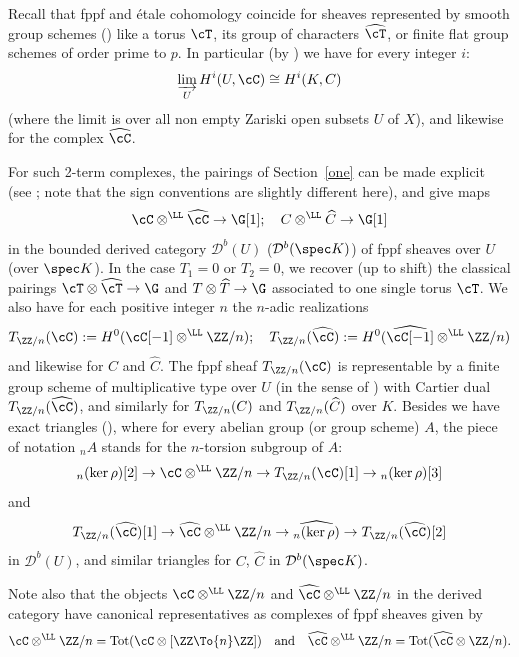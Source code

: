 Recall that fppf and étale
cohomology coincide for sheaves represented by smooth group schemes
(\cite[\S III.3]{MilEC}) like a torus $\cT$, its group
of characters $\widehat \cT$, or finite flat group schemes of order
prime to $p$. In particular (by \cite[Lem.\,III.1.16]{MilEC}) we have
for every integer $i$:
\[
\varinjlim_U H^i(U,\cC) \cong H^i(K,C)
\]
(where the limit is over all non empty Zariski open subsets $U$ of $X$),
and likewise for the complex $\widehat \cC$.

For such 2-term complexes, the pairings of Section~\ref{one}
can be made explicit (see \cite[\S2]{demphd}; note that the sign conventions are slightly different here), and give maps
\[
\cC \otimes^{\LL}
\widehat \cC \to \G[1]; \quad C \otimes^\LL \widehat C \to \G[1]
\]
in the bounded derived category ${\mathcal D}^b(U)$ (\resp ${\mathcal D}^b(\spec K)$)
of fppf sheaves over $U$ (\resp over $\spec K$).
In the case $T_1=0$ or $T_2=0$, we recover (up to shift) the
classical pairings $\cT \otimes \widehat \cT \to \G$ and $T \otimes
\widehat T \to \G$ associated to one single torus $\cT$.
We also have for each positive integer $n$ the $n$-adic realizations
\[
T_{\ZZ/n}(\cC):=H^0(\cC[-1] \otimes^\LL \ZZ/n); \quad
T_{\ZZ/n}(\widehat \cC):=H^0(\widehat \cC[-1] \otimes^\LL \ZZ/n)
\]
and likewise for $C$ and $\widehat C$.
The fppf sheaf $T_{\ZZ/n}(\cC)$ is representable by a finite group
scheme of multiplicative type over $U$ (in the sense of \cite[IX,
Déf.\,1.1]{sga3}) with Cartier dual
$T_{\ZZ/n}(\widehat \cC)$, and similarly for $T_{\ZZ/n}(C)$ and
$T_{\ZZ/n}(\widehat C)$ over $K$. Besides we have exact
triangles (\cite[Lem.\,2.3]{demphd}), where for every abelian group (or group
scheme) $A$, the piece of notation
$_ n A$ stands for the $n$-torsion subgroup of $A$:
\begin{equation} \label{exactriang1}
_n(\ker \rho)[2] \to \cC \otimes^\LL \ZZ/n \to
T_{\ZZ/n}(\cC)[1] \to {}_n(\ker \rho)[3]
\end{equation}
and
\begin{equation} \label{exactriang2}
T_{\ZZ/n}(\widehat \cC)[1] \to {\widehat \cC} \otimes^\LL \ZZ/n \to
\widehat{_n (\ker \rho)} \to T_{\ZZ/n}(\widehat \cC)[2]
\end{equation}
in ${\mathcal D}^b(U)$, and similar triangles for $C$,
$\widehat C$ in ${\mathcal D}^b(\spec K)$.

Note also that the objects $\cC \otimes^\LL \ZZ / n$ and $\widehat{\cC} \otimes^{\LL} \ZZ / n$ in the derived category have canonical representatives as complexes of fppf sheaves given by
\[
\cC \otimes^\LL \ZZ / n = \textup{Tot}(\cC \otimes [\ZZ \To{n} \ZZ])\quad\text{and}\quad\widehat{\cC} \otimes^{\LL} \ZZ / n = \textup{Tot}(\widehat{\cC} \otimes \ZZ / n).
\]

